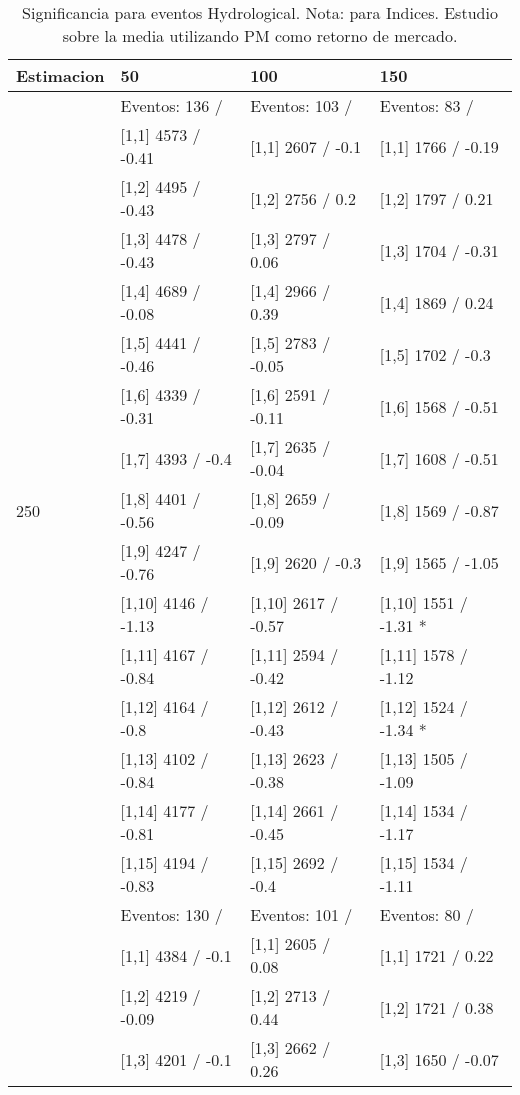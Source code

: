 \begin{table}

\caption{Significancia para eventos Hydrological. Nota: para Indices. Estudio sobre la media utilizando PM como retorno de mercado.}
\centering
\begin{tabular}[t]{llll}
\toprule
Estimacion & 50 & 100 & 150\\
\midrule
 & Eventos:  136 / & Eventos:  103 / & Eventos:  83 /\\
 & {}[1,1] 4573  / -0.41 & {}[1,1] 2607  / -0.1 & {}[1,1] 1766  / -0.19\\
 & {}[1,2] 4495  / -0.43 & {}[1,2] 2756  / 0.2 & {}[1,2] 1797  / 0.21\\
 & {}[1,3] 4478  / -0.43 & {}[1,3] 2797  / 0.06 & {}[1,3] 1704  / -0.31\\
 & {}[1,4] 4689  / -0.08 & {}[1,4] 2966  / 0.39 & {}[1,4] 1869  / 0.24\\
\addlinespace
 & {}[1,5] 4441  / -0.46 & {}[1,5] 2783  / -0.05 & {}[1,5] 1702  / -0.3\\
 & {}[1,6] 4339  / -0.31 & {}[1,6] 2591  / -0.11 & {}[1,6] 1568  / -0.51\\
 & {}[1,7] 4393  / -0.4 & {}[1,7] 2635  / -0.04 & {}[1,7] 1608  / -0.51\\
250 & {}[1,8] 4401  / -0.56 & {}[1,8] 2659  / -0.09 & {}[1,8] 1569  / -0.87\\
 & {}[1,9] 4247  / -0.76 & {}[1,9] 2620  / -0.3 & {}[1,9] 1565  / -1.05\\
\addlinespace
 & {}[1,10] 4146  / -1.13 & {}[1,10] 2617  / -0.57 & {}[1,10] 1551  / -1.31 *\\
 & {}[1,11] 4167  / -0.84 & {}[1,11] 2594  / -0.42 & {}[1,11] 1578  / -1.12\\
 & {}[1,12] 4164  / -0.8 & {}[1,12] 2612  / -0.43 & {}[1,12] 1524  / -1.34 *\\
 & {}[1,13] 4102  / -0.84 & {}[1,13] 2623  / -0.38 & {}[1,13] 1505  / -1.09\\
 & {}[1,14] 4177  / -0.81 & {}[1,14] 2661  / -0.45 & {}[1,14] 1534  / -1.17\\
\addlinespace
 & {}[1,15] 4194  / -0.83 & {}[1,15] 2692  / -0.4 & {}[1,15] 1534  / -1.11\\
 & Eventos:  130 / & Eventos:  101 / & Eventos:  80 /\\
 & {}[1,1] 4384  / -0.1 & {}[1,1] 2605  / 0.08 & {}[1,1] 1721  / 0.22\\
 & {}[1,2] 4219  / -0.09 & {}[1,2] 2713  / 0.44 & {}[1,2] 1721  / 0.38\\
 & {}[1,3] 4201  / -0.1 & {}[1,3] 2662  / 0.26 & {}[1,3] 1650  / -0.07\\

\end{tabular}
\end{table}
